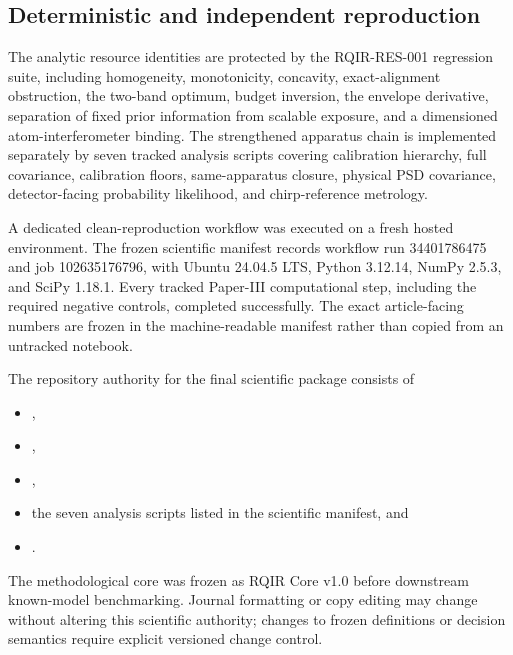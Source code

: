 \subsection{Deterministic and independent reproduction}

The analytic resource identities are protected by the RQIR-RES-001 regression suite, including homogeneity, monotonicity, concavity, exact-alignment obstruction, the two-band optimum, budget inversion, the envelope derivative, separation of fixed prior information from scalable exposure, and a dimensioned atom-interferometer binding. The strengthened apparatus chain is implemented separately by seven tracked analysis scripts covering calibration hierarchy, full covariance, calibration floors, same-apparatus closure, physical PSD covariance, detector-facing probability likelihood, and chirp-reference metrology.

A dedicated clean-reproduction workflow was executed on a fresh hosted environment. The frozen scientific manifest records workflow run 34401786475 and job 102635176796, with Ubuntu 24.04.5 LTS, Python 3.12.14, NumPy 2.5.3, and SciPy 1.18.1. Every tracked Paper-III computational step, including the required negative controls, completed successfully. The exact article-facing numbers are frozen in the machine-readable manifest rather than copied from an untracked notebook.

The repository authority for the final scientific package consists of
\begin{itemize}
\item {},
\item {},
\item {},
\item the seven analysis scripts listed in the scientific manifest, and
\item {}.
\end{itemize}
The methodological core was frozen as RQIR Core v1.0 before downstream known-model benchmarking. Journal formatting or copy editing may change without altering this scientific authority; changes to frozen definitions or decision semantics require explicit versioned change control.
